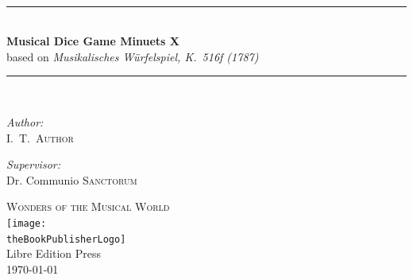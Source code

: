 \documentclass[letterpaper,x11names,svgnames,10pt]{article}
\title{\textsc{\mdgBookTitle}}
\author{\textsc{\authorFirstMidNameInit \authorLastName}}
\date{\textsc{\dateGenerated}}
\def\authorFirstMidNameInit{I.\ T.\ }
\def\authorLastName{Author}
\def\dateGenerated{\today}
\def\volNumber{X}
\def\mdgBookTitle{Musical Dice Game Minuets \volNumber}
\def\mdgBookSubTitle{Musikalisches W\"{u}rfelspiel, K.\ 516f (1787)}
\def\theBookSeries{Wonders of the Musical World}
\def\theBookPublisher{Libre Edition Press}
\def\theBookPublisherLogo{../images/1.png}
\newcommand{\HRule}{\rule{\linewidth}{0.5mm}}
\begin{document}


\newpage
{
${}_{}$\\
\vspace{1.00in}	
\thispagestyle{empty}
\begin{center}
	\HRule \\[0.4cm]
	{\huge \bfseries \mdgBookTitle} \\[0.2cm]
	{\large based on {\em \mdgBookSubTitle} }\\[0.2cm]
	\HRule \\[1.5cm]
	\begin{minipage}{0.4\textwidth}
		\begin{flushleft} \large
			\emph{Author:}\\
			\authorFirstMidNameInit \textsc{\authorLastName}
		\end{flushleft}
	\end{minipage}
	\begin{minipage}{0.4\textwidth}
		\begin{flushright} \large
			\emph{Supervisor:} \\
			Dr. Communio \textsc{Sanctorum}
		\end{flushright}
	\end{minipage}
	\vfill
	{\textsc{\Large \theBookSeries}}  \\[0.2cm] 
	\texttt{[image: \\theBookPublisherLogo]}\\ 
	{\large \theBookPublisher \\
       \dateGenerated }\\
	\vspace{2.50in}
\end{center}
\newpage


\tableofcontents\label{tabofcon}


}
\end{document}
